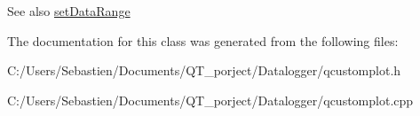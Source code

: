 \begin{DoxySeeAlso}{See also}
\hyperlink{class_q_c_p_color_map_a980b42837821159786a85b4b7dcb8774}{set\+Data\+Range} 
\end{DoxySeeAlso}


The documentation for this class was generated from the following files\+:\begin{DoxyCompactItemize}
\item 
C\+:/\+Users/\+Sebastien/\+Documents/\+Q\+T\+\_\+porject/\+Datalogger/qcustomplot.\+h\item 
C\+:/\+Users/\+Sebastien/\+Documents/\+Q\+T\+\_\+porject/\+Datalogger/qcustomplot.\+cpp\end{DoxyCompactItemize}
